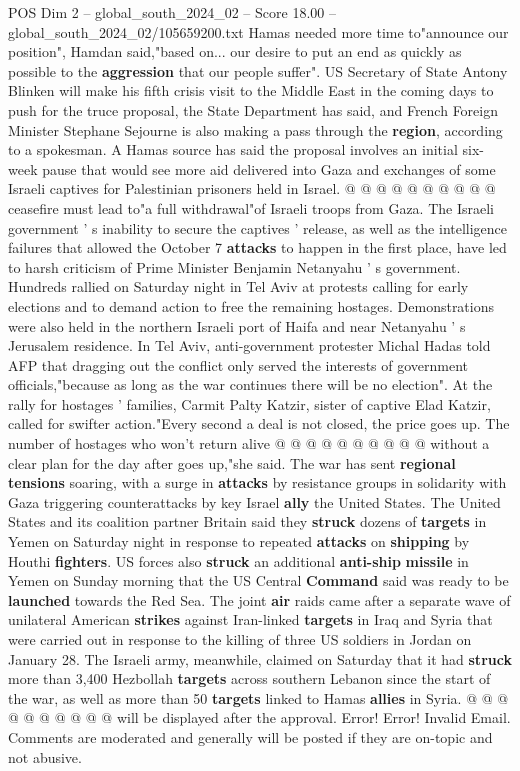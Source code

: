 \begin{textsample}{POS Dim 2 – global\_south\_2024\_02 – Score 18.00 – global\_south\_2024\_02/105659200.txt}
Hamas needed more time to"announce our position", Hamdan said,"based on... our desire to put an end as quickly as possible to the \textbf{aggression} that our people suffer".
US Secretary of State Antony Blinken will make his fifth crisis visit to the Middle East in the coming days to push for the truce proposal, the State Department has said, and French Foreign Minister Stephane Sejourne is also making a pass through the \textbf{region}, according to a spokesman.
A Hamas source has said the proposal involves an initial six-week pause that would see more aid delivered into Gaza and exchanges of some Israeli captives for Palestinian prisoners held in Israel. @ @ @ @ @ @ @ @ @ @ ceasefire must lead to"a full withdrawal"of Israeli troops from Gaza.
The Israeli government ' s inability to secure the captives ' release, as well as the intelligence failures that allowed the October 7 \textbf{attacks} to happen in the first place, have led to harsh criticism of Prime Minister Benjamin Netanyahu ' s government.
Hundreds rallied on Saturday night in Tel Aviv at protests calling for early elections and to demand action to free the remaining hostages.
Demonstrations were also held in the northern Israeli port of Haifa and near Netanyahu ' s Jerusalem residence.
In Tel Aviv, anti-government protester Michal Hadas told AFP that dragging out the conflict only served the interests of government officials,"because as long as the war continues there will be no election".
At the rally for hostages ' families, Carmit Palty Katzir, sister of captive Elad Katzir, called for swifter action."Every second a deal is not closed, the price goes up.
The number of hostages who won't return alive @ @ @ @ @ @ @ @ @ @ without a clear plan for the day after goes up,"she said.
The war has sent \textbf{regional} \textbf{tensions} soaring, with a surge in \textbf{attacks} by resistance groups in solidarity with Gaza triggering counterattacks by key Israel \textbf{ally} the United States.
The United States and its coalition partner Britain said they \textbf{struck} dozens of \textbf{targets} in Yemen on Saturday night in response to repeated \textbf{attacks} on \textbf{shipping} by Houthi \textbf{fighters}.
US forces also \textbf{struck} an additional \textbf{anti-ship} \textbf{missile} in Yemen on Sunday morning that the US Central \textbf{Command} said was ready to be \textbf{launched} towards the Red Sea.
The joint \textbf{air} raids came after a separate wave of unilateral American \textbf{strikes} against Iran-linked \textbf{targets} in Iraq and Syria that were carried out in response to the killing of three US soldiers in Jordan on January 28.
The Israeli army, meanwhile, claimed on Saturday that it had \textbf{struck} more than 3,400 Hezbollah \textbf{targets} across southern Lebanon since the start of the war, as well as more than 50 \textbf{targets} linked to Hamas \textbf{allies} in Syria. @ @ @ @ @ @ @ @ @ @ will be displayed after the approval.
Error!
Error!
Invalid Email.
Comments are moderated and generally will be posted if they are on-topic and not abusive.


\end{textsample}
